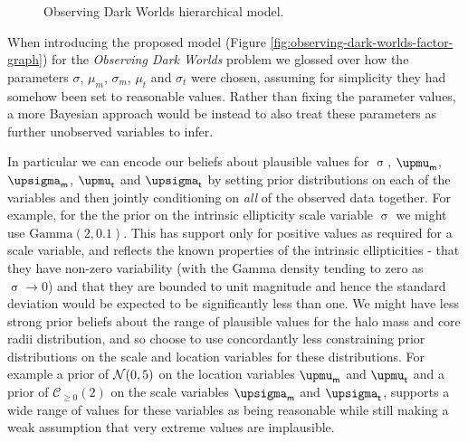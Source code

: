 \begin{figure}
\caption[Observing Dark Worlds hierarchical model.]{Observing Dark Worlds hierarchical model.} %
\label{fig:odw-hierarchical-factor-graph}
\end{figure}

When introducing the proposed model (Figure \ref{fig:observing-dark-worlds-factor-graph}) for the \emph{Observing Dark Worlds} problem we glossed over how the parameters $\sigma$, $\mu_m$, $\sigma_m$, $\mu_t$ and $\sigma_t$ were chosen, assuming for simplicity they had somehow been set to reasonable values. Rather than fixing the parameter values, a more Bayesian approach would be instead to also treat these parameters as further unobserved variables to infer.

In particular we can encode our beliefs about plausible values for $\upsigma$, $\upmu_{\rvar{m}}$, $\upsigma_{\rvar{m}}$, $\upmu_{\rvar{t}}$ and $\upsigma_{\rvar{t}}$ by setting prior distributions on each of the variables and then jointly conditioning on \emph{all} of the observed data together. For example, for the the prior on the intrinsic ellipticity scale variable $\upsigma$ we might use $\mathrm{Gamma}(2,0.1)$. This has support only for positive values as required for a scale variable, and reflects the known properties of the intrinsic ellipticities - that they have non-zero variability (with the Gamma density tending to zero as $\upsigma \to 0$) and that they are bounded to unit magnitude and hence the standard deviation would be expected to be significantly less than one. We might have less strong prior beliefs about the range of plausible values for the halo mass and core radii distribution, and so choose to use concordantly less constraining prior distributions on the scale and location variables for these distributions. For example a prior of $\nrm{0, 5}$ on the location variables $\upmu_{\rvar{m}}$ and $\upmu_{\rvar{t}}$ and a prior of $\mathcal{C}_{\geq 0}(2)$ on the scale variables $\upsigma_{\rvar{m}}$ and $\upsigma_{\rvar{t}}$, supports a wide range of values for these variables as being reasonable while still making a weak assumption that very extreme values are implausible.

